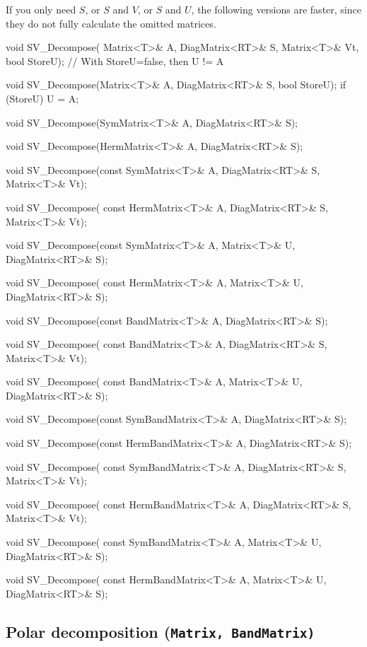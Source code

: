If you only need $S$, or $S$ and $V$, or $S$ and $U$, the following 
versions are faster, since they do
not fully calculate the omitted matrices.  
\begin{tmvcode}
void SV_Decompose(
      Matrix<T>& A, DiagMatrix<RT>& S, Matrix<T>& Vt, bool StoreU);
// With StoreU=false, then U != A

void SV_Decompose(Matrix<T>& A, DiagMatrix<RT>& S, bool StoreU);
if (StoreU) U = A;

void SV_Decompose(SymMatrix<T>& A, DiagMatrix<RT>& S);

void SV_Decompose(HermMatrix<T>& A, DiagMatrix<RT>& S);
      
void SV_Decompose(const SymMatrix<T>& A, DiagMatrix<RT>& S, Matrix<T>& Vt);
      
void SV_Decompose(
      const HermMatrix<T>& A, DiagMatrix<RT>& S, Matrix<T>& Vt);
      
void SV_Decompose(const SymMatrix<T>& A, Matrix<T>& U, DiagMatrix<RT>& S);
      
void SV_Decompose(
      const HermMatrix<T>& A, Matrix<T>& U, DiagMatrix<RT>& S);
      
void SV_Decompose(const BandMatrix<T>& A, DiagMatrix<RT>& S);

void SV_Decompose(
      const BandMatrix<T>& A, DiagMatrix<RT>& S, Matrix<T>& Vt);
      
void SV_Decompose(
      const BandMatrix<T>& A, Matrix<T>& U, DiagMatrix<RT>& S);
      
void SV_Decompose(const SymBandMatrix<T>& A, DiagMatrix<RT>& S);
      
void SV_Decompose(const HermBandMatrix<T>& A, DiagMatrix<RT>& S);
      
void SV_Decompose(
      const SymBandMatrix<T>& A, DiagMatrix<RT>& S, Matrix<T>& Vt);

void SV_Decompose(
      const HermBandMatrix<T>& A, DiagMatrix<RT>& S, Matrix<T>& Vt);

void SV_Decompose(
      const SymBandMatrix<T>& A, Matrix<T>& U, DiagMatrix<RT>& S);

void SV_Decompose(
      const HermBandMatrix<T>& A, Matrix<T>& U, DiagMatrix<RT>& S);
\end{tmvcode}

\subsection[Polar decomposition] {Polar decomposition \rm (\tt{Matrix}, \tt{BandMatrix})}

